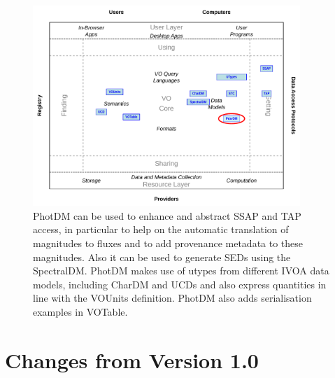 \documentclass[11pt,a4paper]{ivoa}
\begin{document}
\begin{figure}[H] 
\centering


\includegraphics[width=0.9\textwidth]{role_diagram.pdf}
\caption{PhotDM can be used to enhance and abstract SSAP and TAP access, in particular 
to help on the automatic translation of magnitudes to fluxes and to add provenance 
metadata to these magnitudes. Also it can be used to generate SEDs using the SpectralDM.
PhotDM makes use of utypes from different IVOA data models, including CharDM and UCDs and
also express quantities in line with the VOUnits definition.
PhotDM also adds serialisation examples in VOTable.
}
\label{fig:archdiag}
\end{figure}

\section*{Changes from Version 1.0} \label{changesTable}

\end{document}
